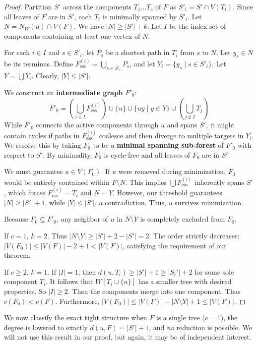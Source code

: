 \documentclass[11pt]{amsart}
\begin{document}
\begin{proof}
Partition $S'$ across the components $T_1 \dots T_c$ of $F$ as $S'_i = S' \cap V(T_i)$. Since all leaves of $F$ are in $S'$, each $T_i$ is minimally spanned by $S'_i$. 
Let $N = N_W(u) \cap V(F)$. We have $|N| \ge |S'| + k$. Let $I$ be the index set of components containing at least one vertex of $N$. 

For each $i \in I$ and $s \in S'_i$, let $P_s$ be a shortest path in $T_i$ from $s$ to $N$. Let $y_s \in N$ be its terminus. Define $F_{\text{ess}}^{(i)} = \bigcup_{s \in S'_i} P_s$, and let $Y_i = \{y_s \mid s \in S'_i\}$. Let $Y = \bigcup Y_i$. Clearly, $|Y| \le |S'|$.

We construct an \textbf{intermediate graph} $F'_0$:
\[
F'_0 = \left( \bigcup_{i \in I} F_{\text{ess}}^{(i)} \right) \cup \{u\} \cup \{uy \mid y \in Y\} \cup \left( \bigcup_{j \notin I} T_j \right)
\]
While $F'_0$ connects the active components through $u$ and spans $S'$, it might contain cycles if paths in $F_{\text{ess}}^{(i)}$ coalesce and then diverge to multiple targets in $Y_i$. We resolve this by taking $F_0$ to be a \textbf{minimal spanning sub-forest} of $F'_0$ with respect to $S'$. By minimality, $F_0$ is cycle-free and all leaves of $F_0$ are in $S'$. 

We must guarantee $u \in V(F_0)$. If $u$ were removed during minimization, $F_0$ would be entirely contained within $F \setminus N$. This implies $\bigcup F_{\text{ess}}^{(i)}$ inherently spans $S'$, which forces $F_{\text{ess}}^{(i)} = T_i$ and $N = Y$. However, our threshold guarantees $|N| \ge |S'| + 1$, while $|Y| \le |S'|$, a contradiction. Thus, $u$ survives minimization.

Because $F_0 \subseteq F'_0$, any neighbor of $u$ in $N \setminus Y$ is completely excluded from $F_0$.

If $c = 1$, $k=2$. Thus $|N \setminus Y| \ge |S'|+2 - |S'| = 2$. The order strictly decreases: $|V(F_0)| \le |V(F)| - 2 + 1 < |V(F)|$, satisfying the requirement of our theorem. 

If $c \ge 2$, $k=1$. If $|I|=1$, then $d(u, T_i)\ge |S'|+1\ge |S_i'|+2$ for some sole component $T_i$. It follows that $W[T_i\cup \{u\}]$ has a smaller tree with desired properties. So $|I| \ge 2$.  Then the components merge into one component.  Thus $c(F_0) < c(F)$. Furthermore, $|V(F_0)| \le |V(F)| - |N \setminus Y| + 1 \le |V(F)|$.
\end{proof}



We now classify the exact tight structure when $F$ is a single tree ($c=1$), the degree is lowered to exactly $d(u, F) = |S'| + 1$, and \textit{no} reduction is possible. We will not use this result in our proof, but again, it may be of independent interest. 
\end{document}
